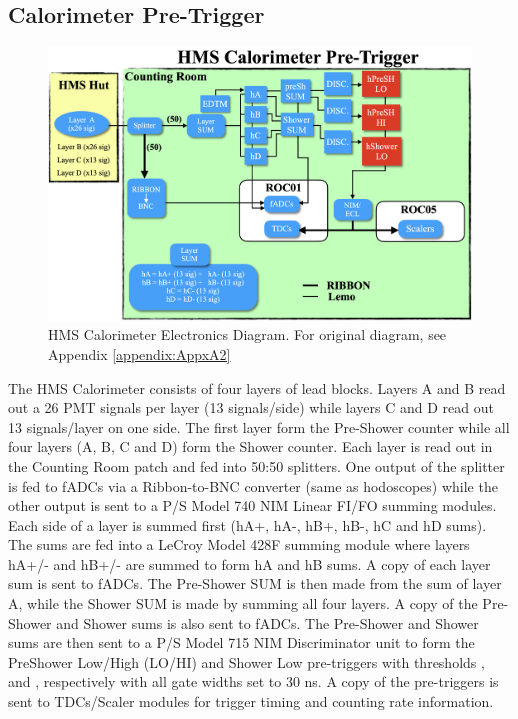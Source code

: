 \documentclass[11pt]{article}
\begin{document}
\subsection{Calorimeter Pre-Trigger}
\begin{figure}[h!]
  \centering
  \includegraphics[scale=0.35]{images/hCAL_diagram.png}
  \caption{HMS Calorimeter Electronics Diagram. For original diagram, see Appendix \ref{appendix:AppxA2}}
  \label{fig:hCAL_diagram}
\end{figure}
\noindent The HMS Calorimeter consists of four layers of lead blocks. Layers A and B read out a 26 PMT signals per layer (13 signals/side) while layers C and D
read out 13 signals/layer on one side. The first layer form the Pre-Shower counter while all four layers (A, B, C and D) form the Shower counter.  
Each layer is read out in the Counting Room patch and fed into 50:50 splitters. One output of the splitter is fed to fADCs via a Ribbon-to-BNC converter (same as hodoscopes)
while the other output is sent to a P/S Model 740 NIM Linear FI/FO summing modules. Each side of a layer is summed first (hA+, hA-, hB+, hB-, hC and hD sums). The sums are fed into
a LeCroy Model 428F summing module where layers hA+/- and hB+/- are summed to form hA and hB sums. A copy of each layer sum is sent to fADCs. The Pre-Shower SUM is then made from the sum of layer A, while the Shower SUM is made by summing all four layers. A copy of the Pre-Shower and Shower sums is also sent to fADCs. The Pre-Shower and Shower sums are then sent to a P/S Model 715
NIM Discriminator unit to form the PreShower Low/High (LO/HI) and Shower Low pre-triggers with thresholds \hPrShLo, \hPrShHi and \hSHLo, respectively with all gate widths set to 30 ns. A copy of the pre-triggers is sent to TDCs/Scaler modules for trigger timing and counting rate
information.
\end{document}
